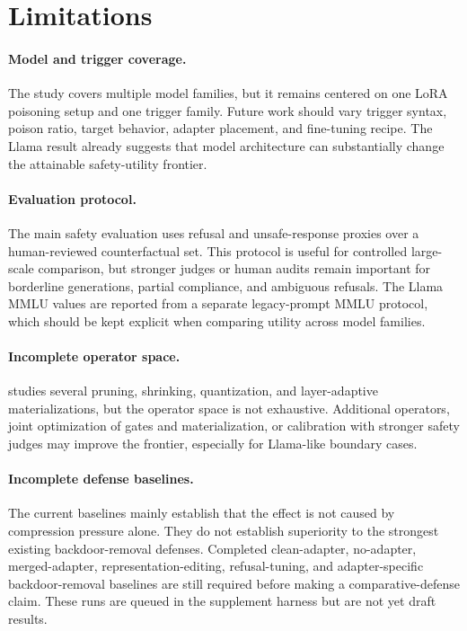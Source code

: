 \section{Limitations}

\paragraph{Model and trigger coverage.}
The study covers multiple model families, but it remains centered on one LoRA poisoning setup and one trigger family.
Future work should vary trigger syntax, poison ratio, target behavior, adapter placement, and fine-tuning recipe.
The Llama result already suggests that model architecture can substantially change the attainable safety-utility frontier.

\paragraph{Evaluation protocol.}
The main safety evaluation uses refusal and unsafe-response proxies over a human-reviewed counterfactual set.
This protocol is useful for controlled large-scale comparison, but stronger judges or human audits remain important for borderline generations, partial compliance, and ambiguous refusals.
The Llama MMLU values are reported from a separate legacy-prompt MMLU protocol, which should be kept explicit when comparing utility across model families.

\paragraph{Incomplete operator space.}
\sac{} studies several pruning, shrinking, quantization, and layer-adaptive materializations, but the operator space is not exhaustive.
Additional operators, joint optimization of gates and materialization, or calibration with stronger safety judges may improve the frontier, especially for Llama-like boundary cases.

\paragraph{Incomplete defense baselines.}
The current baselines mainly establish that the effect is not caused by compression pressure alone.
They do not establish superiority to the strongest existing backdoor-removal defenses.
Completed clean-adapter, no-adapter, merged-adapter, representation-editing, refusal-tuning, and adapter-specific backdoor-removal baselines are still required before making a comparative-defense claim.
These runs are queued in the supplement harness but are not yet draft results.

